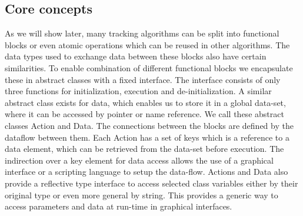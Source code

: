 \documentclass{article}
\begin{document}
\subsection{Core concepts }
\par As we will show later, many tracking algorithms can be split into functional blocks or even atomic operations which can be reused in other algorithms. The data types used to exchange data between these blocks also have certain similarities. To enable combination of different functional blocks we encapsulate these in abstract classes with a ﬁxed interface. The interface consists of only three functions for initialization, execution and de-initialization. A similar abstract class exists for data, which enables us to store it in a global data-set, where it can be accessed by pointer or name reference. We call these abstract classes Action and Data. The connections between the blocks are deﬁned by the dataﬂow between them. Each Action has a set of keys which is a reference to a data element, which can be retrieved from the data-set before execution. The indirection over a key element for data access allows the use of a graphical interface or a scripting language to setup the data-ﬂow. Actions and Data also provide a reﬂective type interface to access selected class variables either by their original type or even more general by string. This provides a generic way to access parameters and data at run-time in graphical interfaces.  
\end{document}
